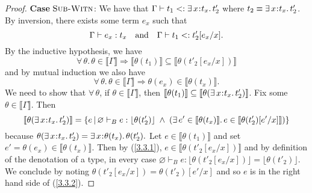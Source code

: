 \documentclass[11pt]{article}
\newcommand{\bind}{\hspace{0.05em}{:}\hspace{0.05em}} %
\newcommand{\lb}{\llbracket}         %
\newcommand{\rb}{\rrbracket}         %
\begin{document}
\begin{proof}
{\bf Case} $\textsc{Sub-Witn}$: We have that
$\Gamma \vdash t_1 <: \exists\, x\bind t_x.\, t'_2$ where $t_2 \equiv \exists\, x\bind t_x.\, t'_2$. By inversion, there exists some term $e_x$ such that
\[
\Gamma \vdash e_x : t_x \quad {\rm and} \quad \Gamma \vdash t_1 <: t'_2[e_x/x].
\]
By the inductive hypothesis, we have
\begin{equation}\label{3.3.1}
\forall\, \theta.\, \theta\in \lb\Gamma\rb \Rightarrow \lb \theta(t_1) \rb \subseteq \lb \theta(t'_2[e_x/x]) \rb 
\end{equation}
and by mutual induction we also have
\[
\forall\, \theta.\, \theta\in \lb\Gamma\rb \Rightarrow \theta(e_x) \in \lb\theta(t_x)\rb.
\]
We need to show that $\forall\, \theta$, if $\theta \in \lb\Gamma\rb$, then $\lb\theta(t_1)\rb \subseteq \lb \theta(\exists\, x\bind t_x.\, t'_2)\rb$. Fix some $\theta \in \lb\Gamma\rb.$ Then
\begin{equation} \label{3.3.2}
\lb \theta(\exists\, x\bind t_x.\, t'_2)\rb
= \{ e \,|\, \varnothing \vdash_B e : \lfloor \theta(t'_2)\rfloor \;\wedge\; 
  (\exists\, e' \in \lb \theta(t_x)\rb.\, e \in\lb \theta(t'_2)[e'/x]\rb)\}
\end{equation}
because $\theta(\exists\, x\bind t_x.\, t'_2) = \exists\, x\bind\theta(t_x).\, \theta(t'_2).$
Let $e \in \lb\theta(t_1)\rb$ and set $e' = \theta(e_x) \in \lb\theta(t_x)\rb.$ Then by (\ref{3.3.1}), $e \in \lb\theta(t'_2[e_x/x])\rb$ and by definition of the denotation of a type, in every case $\varnothing \vdash_B e : \lfloor \theta(t'_2[e_x/x])\rfloor = \lfloor\theta(t'_2)\rfloor$. We conclude by noting $\theta(t'_2[e_x/x]) = \theta(t'_2)[e'/x]$ and so $e$ is in the right hand side of (\ref{3.3.2}).


\end{proof}
\end{document}

